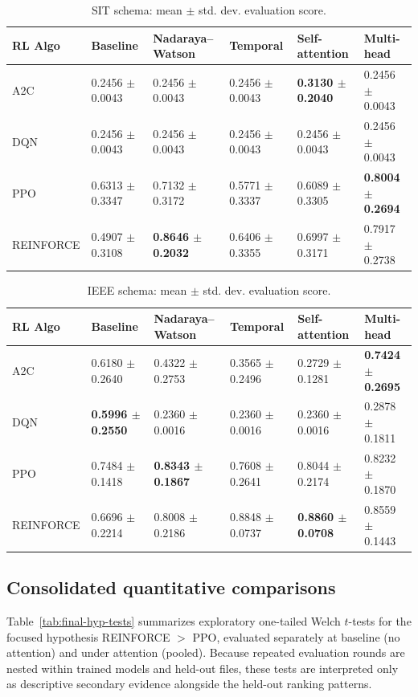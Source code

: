 \documentclass[12pt,oneside]{book}
\begin{document}
\begin{table}[htbp]
	\centering
	\caption{SIT schema: mean $\pm$ std. dev. evaluation score.}
	\label{tab:sit_main_results}
	\begin{tabular}{l l l l l l}
	\toprule
	\textbf{RL Algo} & \textbf{Baseline} & \textbf{Nadaraya--Watson} & \textbf{Temporal} & \textbf{Self-attention} & \textbf{Multi-head}\\
	\midrule
	A2C & 0.2456 $\pm$ 0.0043 & 0.2456 $\pm$ 0.0043 & 0.2456 $\pm$ 0.0043 & \textbf{0.3130 $\pm$ 0.2040} & 0.2456 $\pm$ 0.0043\\
	DQN & 0.2456 $\pm$ 0.0043 & 0.2456 $\pm$ 0.0043 & 0.2456 $\pm$ 0.0043 & 0.2456 $\pm$ 0.0043 & 0.2456 $\pm$ 0.0043\\
	PPO & 0.6313 $\pm$ 0.3347 & 0.7132 $\pm$ 0.3172 & 0.5771 $\pm$ 0.3337 & 0.6089 $\pm$ 0.3305 & \textbf{0.8004 $\pm$ 0.2694}\\
	REINFORCE & 0.4907 $\pm$ 0.3108 & \textbf{0.8646 $\pm$ 0.2032} & 0.6406 $\pm$ 0.3355 & 0.6997 $\pm$ 0.3171 & 0.7917 $\pm$ 0.2738\\
	\bottomrule
	\end{tabular}
\end{table}

\begin{table}[htbp]
	\centering
	\caption{IEEE schema: mean $\pm$ std. dev. evaluation score.}
	\label{tab:ieee_main_results}
	\begin{tabular}{l l l l l l}
	\toprule
	\textbf{RL Algo} & \textbf{Baseline} & \textbf{Nadaraya--Watson} & \textbf{Temporal} & \textbf{Self-attention} & \textbf{Multi-head}\\
	\midrule
	A2C & 0.6180 $\pm$ 0.2640 & 0.4322 $\pm$ 0.2753 & 0.3565 $\pm$ 0.2496 & 0.2729 $\pm$ 0.1281 & \textbf{0.7424 $\pm$ 0.2695}\\
	DQN & \textbf{0.5996 $\pm$ 0.2550} & 0.2360 $\pm$ 0.0016 & 0.2360 $\pm$ 0.0016 & 0.2360 $\pm$ 0.0016 & 0.2878 $\pm$ 0.1811\\
	PPO & 0.7484 $\pm$ 0.1418 & \textbf{0.8343 $\pm$ 0.1867} & 0.7608 $\pm$ 0.2641 & 0.8044 $\pm$ 0.2174 & 0.8232 $\pm$ 0.1870\\
	REINFORCE & 0.6696 $\pm$ 0.2214 & 0.8008 $\pm$ 0.2186 & 0.8848 $\pm$ 0.0737 & \textbf{0.8860 $\pm$ 0.0708} & 0.8559 $\pm$ 0.1443\\
	\bottomrule
	\end{tabular}
\end{table}

\subsection{Consolidated quantitative comparisons}
Table~\ref{tab:final-hyp-tests} summarizes exploratory one-tailed Welch $t$-tests for the focused hypothesis \textsc{REINFORCE} $>$ \textsc{PPO}, evaluated separately at baseline (no attention) and under attention (pooled). Because repeated evaluation rounds are nested within trained models and held-out files, these tests are interpreted only as descriptive secondary evidence alongside the held-out ranking patterns.
\end{document}

